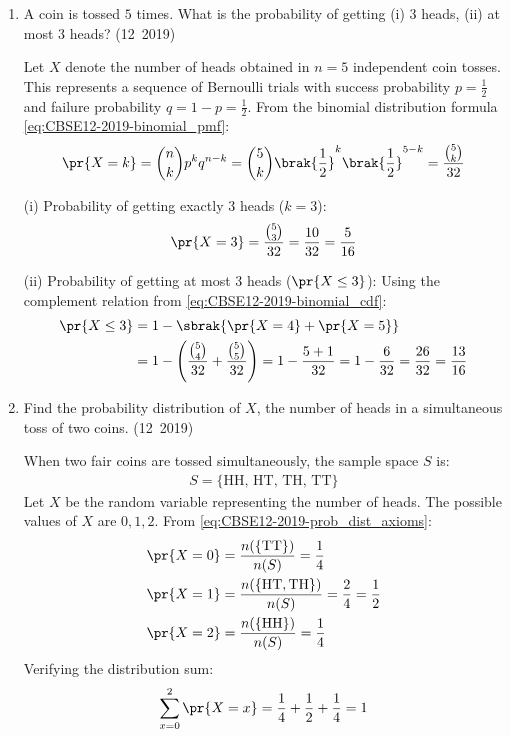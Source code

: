 \begin{enumerate}[label=\thesubsection.\arabic*, ref=\thesubsection.\theenumi]
\item A coin is tossed $5$ times. What is the probability of getting (i) $3$ heads, (ii) at most $3$ heads?
\hfill (12~2019)

\solution
Let $X$ denote the number of heads obtained in $n = 5$ independent coin tosses. This represents a sequence of Bernoulli trials with success probability $p = \frac{1}{2}$ and failure probability $q = 1 - p = \frac{1}{2}$.
From the binomial distribution formula \eqref{eq:CBSE12-2019-binomial_pmf}:
\begin{align}
	\pr{X = k} = \binom{n}{k} p^k q^{n-k} = \binom{5}{k} \brak{\frac{1}{2}}^k \brak{\frac{1}{2}}^{5-k} = \frac{\binom{5}{k}}{32}
\end{align}

(i) Probability of getting exactly $3$ heads ($k = 3$):
\begin{align}
	\pr{X = 3} = \frac{\binom{5}{3}}{32} = \frac{10}{32} = \frac{5}{16}
\end{align}

(ii) Probability of getting at most $3$ heads ($\pr{X \le 3}$):
Using the complement relation from \eqref{eq:CBSE12-2019-binomial_cdf}:
\begin{align}
	\pr{X \le 3} &= 1 - \sbrak{\pr{X = 4} + \pr{X = 5}} \\
	&= 1 - \left(\frac{\binom{5}{4}}{32} + \frac{\binom{5}{5}}{32}\right) = 1 - \frac{5 + 1}{32} = 1 - \frac{6}{32} = \frac{26}{32} = \frac{13}{16}
\end{align}


\item Find the probability distribution of $X$, the number of heads in a simultaneous toss of two coins.
\hfill (12~2019)

\solution
When two fair coins are tossed simultaneously, the sample space $S$ is:
\begin{align}
	S = \{\text{HH}, \, \text{HT}, \, \text{TH}, \, \text{TT}\}
\end{align}
Let $X$ be the random variable representing the number of heads. The possible values of $X$ are $0, 1, 2$.
From \eqref{eq:CBSE12-2019-prob_dist_axioms}:
\begin{align}
	\pr{X = 0} &= \frac{n(\{\text{TT}\})}{n(S)} = \frac{1}{4} \\
	\pr{X = 1} &= \frac{n(\{\text{HT}, \text{TH}\})}{n(S)} = \frac{2}{4} = \frac{1}{2} \\
	\pr{X = 2} &= \frac{n(\{\text{HH}\})}{n(S)} = \frac{1}{4}
\end{align}
Verifying the distribution sum:
\begin{align}
	\sum_{x=0}^{2} \pr{X = x} = \frac{1}{4} + \frac{1}{2} + \frac{1}{4} = 1
\end{align}



\end{enumerate}
